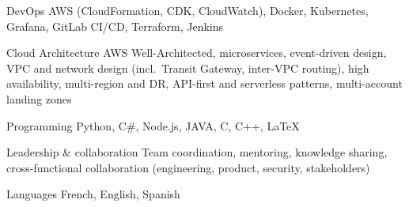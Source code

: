 

\begin{cvskills}

  \cvskill
    {DevOps}
    {AWS (CloudFormation, CDK, CloudWatch), Docker, Kubernetes, Grafana, GitLab CI/CD, Terraform, Jenkins}

  \cvskill
    {Cloud Architecture}
    {AWS Well-Architected, microservices, event-driven design, VPC and network design (incl.\ Transit Gateway, inter-VPC routing), high availability, multi-region and DR, API-first and serverless patterns, multi-account landing zones}

  \cvskill
    {Programming}
    {Python, C\#, Node.js, JAVA, C, C++, LaTeX}

  \cvskill
    {Leadership \& collaboration}
    {Team coordination, mentoring, knowledge sharing, cross-functional collaboration (engineering, product, security, stakeholders)}

  \cvskill
    {Languages}
    {French, English, Spanish}

\end{cvskills}
